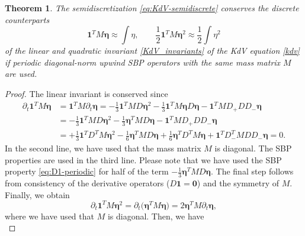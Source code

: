 \documentclass{article}
\newcommand{\ukdv}{\eta}
\newtheorem{thm}{Theorem}
\begin{document}
\begin{thm}
\label{thm:KdV-semidiscrete}
    The semidiscretization \eqref{eq:KdV-semidiscrete} conserves the discrete
    counterparts
    \begin{equation}
        \pmb{1}^T M \pmb{\ukdv} \approx \int \ukdv,
        \qquad
        \frac{1}{2} \pmb{1}^T M \pmb{\ukdv}^2 \approx \frac{1}{2} \int \ukdv^2
    \end{equation}
    of the linear and quadratic invariant \eqref{KdV_invariants} of the KdV
    equation \eqref{kdv} if periodic diagonal-norm upwind SBP operators with the
    same mass matrix $M$ are used.
\end{thm}
\begin{proof}
    The linear invariant is conserved since
    \begin{equation}
    \begin{aligned}
        \partial_t \pmb{1}^T M \pmb{\ukdv}
        &=
        \pmb{1}^T M \partial_t \pmb{\ukdv}
        =
        - \frac{1}{3} \pmb{1}^T M D \pmb{\ukdv}^2
        - \frac{1}{3} \pmb{1}^T M \pmb{\ukdv} D \pmb{\ukdv}
        - \pmb{1}^T M D_+ D D_- \pmb{\ukdv}
        \\
        &=
        - \frac{1}{3} \pmb{1}^T M D \pmb{\ukdv}^2
        - \frac{1}{3} \pmb{\ukdv}^T M D \pmb{\ukdv}
        - \pmb{1}^T M D_+ D D_- \pmb{\ukdv}
        \\
        &=
        + \frac{1}{3} \pmb{1}^T D^T M \pmb{\ukdv}^2
        - \frac{1}{6} \pmb{\ukdv}^T M D \pmb{\ukdv}
        + \frac{1}{6} \pmb{\ukdv}^T D^T M \pmb{\ukdv}
        + \pmb{1}^T D_-^T M D D_- \pmb{\ukdv}
        =
        0.
    \end{aligned}
    \end{equation}
    In the second line, we have used that the mass matrix $M$ is diagonal.
    The SBP properties are used in the third line.
    Please note that we have used the SBP property \eqref{eq:D1-periodic}
    for half of the
    term $- \frac{1}{3} \pmb{\ukdv}^T M D \pmb{\ukdv}$.
    The final step follows from consistency of the derivative operators
    ($D \pmb{1} = \pmb{0}$) and the symmetry of $M$.
    Finally, we obtain
    \begin{equation}
        \partial_t \pmb{1}^T M \pmb{\ukdv}^2
        =
        \partial_t \bigl( \pmb{\ukdv}^T M \pmb{\ukdv} \bigr)
        =
        2 \pmb{\ukdv}^T M \partial_t \pmb{\ukdv},
    \end{equation}
    where we have used that $M$ is diagonal. Then, we have
    \begin{equation}

\end{equation}
\end{proof}
\end{document}
